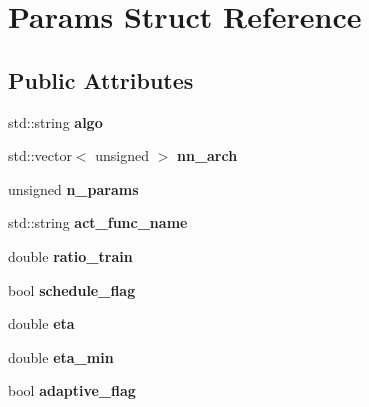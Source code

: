 \hypertarget{struct_params}{}\section{Params Struct Reference}
\label{struct_params}
\subsection*{Public Attributes}
\begin{DoxyCompactItemize}
\item 
\hypertarget{struct_params_a88746ed42fe391f830c403cedb1193a5}{}std\+::string {\bfseries algo}\label{struct_params_a88746ed42fe391f830c403cedb1193a5}

\item 
\hypertarget{struct_params_a2d2a66ab390c4dda9c26e17ddb2055f0}{}std\+::vector$<$ unsigned $>$ {\bfseries nn\+\_\+arch}\label{struct_params_a2d2a66ab390c4dda9c26e17ddb2055f0}

\item 
\hypertarget{struct_params_a415bd96d2d7547cd67080839b2836a31}{}unsigned {\bfseries n\+\_\+params}\label{struct_params_a415bd96d2d7547cd67080839b2836a31}

\item 
\hypertarget{struct_params_a86164c8cf081484b7cb75a917da664a3}{}std\+::string {\bfseries act\+\_\+func\+\_\+name}\label{struct_params_a86164c8cf081484b7cb75a917da664a3}

\item 
\hypertarget{struct_params_a3750fc7b5585673e143de83f279f8b38}{}double {\bfseries ratio\+\_\+train}\label{struct_params_a3750fc7b5585673e143de83f279f8b38}

\item 
\hypertarget{struct_params_aa8dc3d413bb25e95185ca10679179363}{}bool {\bfseries schedule\+\_\+flag}\label{struct_params_aa8dc3d413bb25e95185ca10679179363}

\item 
\hypertarget{struct_params_ad27067c6caa54936cd94fff83d1ce834}{}double {\bfseries eta}\label{struct_params_ad27067c6caa54936cd94fff83d1ce834}

\item 
\hypertarget{struct_params_a18696b8c8f4bd37804d30fb60983aca8}{}double {\bfseries eta\+\_\+min}\label{struct_params_a18696b8c8f4bd37804d30fb60983aca8}

\item 
\hypertarget{struct_params_af70cb3045ba2b74208ab7ae5befe8665}{}bool {\bfseries adaptive\+\_\+flag}\label{struct_params_af70cb3045ba2b74208ab7ae5befe8665}


\end{DoxyCompactItemize}
